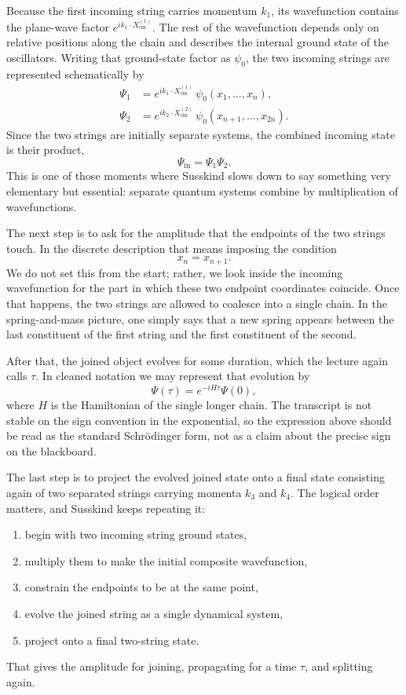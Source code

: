 Because the first incoming string carries momentum \(k_1\), its wavefunction contains the plane-wave factor \(e^{ik_1\cdot X_{\mathrm{cm}}^{(1)}}\). The rest of the wavefunction depends only on relative positions along the chain and describes the internal ground state of the oscillators. Writing that ground-state factor as \(\psi_0\), the two incoming strings are represented schematically by
\begin{align}
\Psi_1 &= e^{ik_1\cdot X_{\mathrm{cm}}^{(1)}}\,\psi_0(x_1,\dots,x_n),\\
\Psi_2 &= e^{ik_2\cdot X_{\mathrm{cm}}^{(2)}}\,\psi_0(x_{n+1},\dots,x_{2n}).
\end{align}
Since the two strings are initially separate systems, the combined incoming state is their product,
\begin{equation}
\Psi_{\mathrm{in}}=\Psi_1\Psi_2.
\end{equation}
This is one of those moments where Susskind slows down to say something very elementary but essential: separate quantum systems combine by multiplication of wavefunctions.

The next step is to ask for the amplitude that the endpoints of the two strings touch. In the discrete description that means imposing the condition
\begin{equation}
x_n=x_{n+1}.
\end{equation}
We do not set this from the start; rather, we look inside the incoming wavefunction for the part in which these two endpoint coordinates coincide. Once that happens, the two strings are allowed to coalesce into a single chain. In the spring-and-mass picture, one simply says that a new spring appears between the last constituent of the first string and the first constituent of the second.

After that, the joined object evolves for some duration, which the lecture again calls \(\tau\). In cleaned notation we may represent that evolution by
\begin{equation}
\Psi(\tau)=e^{-iH\tau}\Psi(0),
\end{equation}
where \(H\) is the Hamiltonian of the single longer chain. The transcript is not stable on the sign convention in the exponential, so the expression above should be read as the standard Schr\"odinger form, not as a claim about the precise sign on the blackboard.

The last step is to project the evolved joined state onto a final state consisting again of two separated strings carrying momenta \(k_3\) and \(k_4\). The logical order matters, and Susskind keeps repeating it:
\begin{enumerate}
\item begin with two incoming string ground states,
\item multiply them to make the initial composite wavefunction,
\item constrain the endpoints to be at the same point,
\item evolve the joined string as a single dynamical system,
\item project onto a final two-string state.
\end{enumerate}
That gives the amplitude for joining, propagating for a time \(\tau\), and splitting again.


